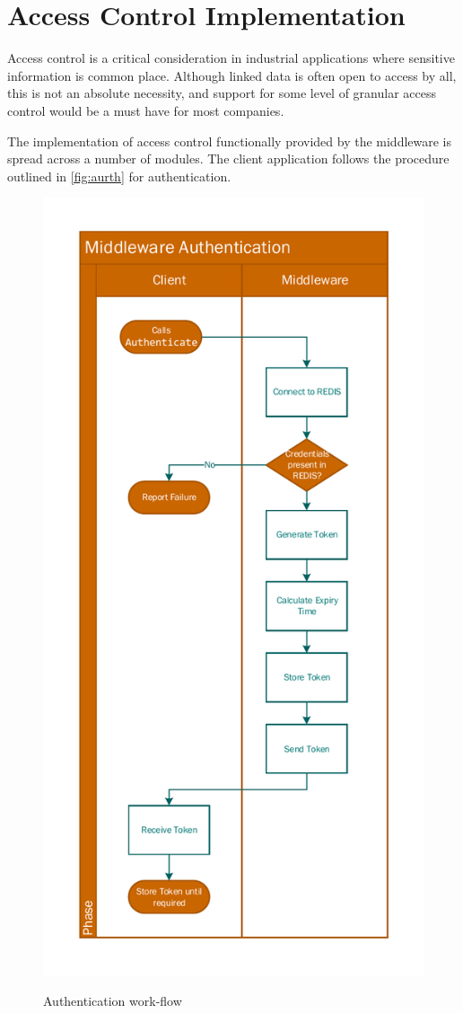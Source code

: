 \section{Access Control Implementation}
Access control is a critical consideration in industrial applications where sensitive information is common place. Although linked data is often open to access by all, this is not an absolute necessity, and support for some level of granular access control would be a must have for most companies.

The implementation of access control functionally provided by the middleware is spread across a number of modules. The client application follows the procedure outlined in \autoref{fig:aurth} for authentication.

 \begin{figure}[!htbp]
\myfloatalign
{\includegraphics[width=0.95\linewidth]{gfx/MiddlewareAurthentication}} 
\caption{Authentication work-flow}
\label{fig:aurth}
\end{figure}

